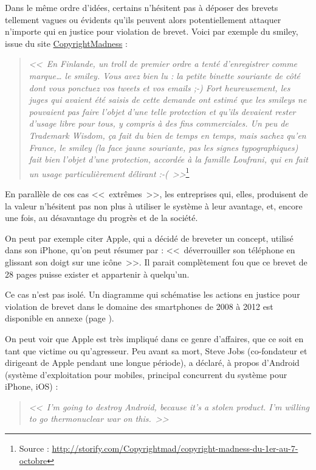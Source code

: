 Dans le même ordre d'idées, certains n'hésitent pas à déposer des brevets tellement vagues ou évidents qu'ils peuvent alors potentiellement attaquer n'importe qui en justice pour violation de brevet.
Voici par exemple du smiley, issue du site \href{http://copyrightmadness.tumblr.com/}{CopyrightMadness} :

\begin{quotation}
\textit{<<~En Finlande, un troll de premier ordre a tenté d'enregistrer comme marque\dots{} le smiley.
Vous avez bien lu : la petite binette souriante de côté dont vous ponctuez vos tweets et vos emails ;-)
Fort heureusement, les juges qui avaient été saisis de cette demande ont estimé que les smileys ne pouvaient pas faire l'objet d'une telle protection et qu'ils devaient rester d'usage libre pour tous, y compris à des fins commerciales.
Un peu de Trademark Wisdom, ça fait du bien de temps en temps, mais sachez qu'en France, le smiley (la face jaune souriante, pas les signes typographiques) fait bien l'objet d'une protection, accordée à la famille Loufrani, qui en fait un usage particulièrement délirant :-(~>>}\footnote{Source : \url{http://storify.com/Copyrightmad/copyright-madness-du-1er-au-7-octobre}}
\end{quotation}

En parallèle de ces cas <<~extrêmes~>>, les entreprises qui, elles, produisent de la valeur n'hésitent pas non plus à utiliser le système à leur avantage, et, encore une fois, au désavantage du progrès et de la société.

On peut par exemple citer Apple, qui a décidé de breveter un concept, utilisé dans son iPhone, qu'on peut résumer par : <<~déverrouiller son téléphone en glissant son doigt sur une icône~>>.
Il parait complètement fou que ce brevet de 28 pages puisse exister et appartenir à quelqu'un.

Ce cas n'est pas isolé.
Un diagramme qui schématise les actions en justice pour violation de brevet dans le domaine des smartphones de 2008 à 2012 est disponible en annexe (page \pageref{annexe-smartphones}).

On peut voir que Apple est très impliqué dans ce genre d'affaires, que ce soit en tant que victime ou qu'agresseur.
Peu avant sa mort, Steve Jobs (co-fondateur et dirigeant de Apple pendant une longue période), a déclaré, à propos d'Android (système d'exploitation pour mobiles, principal concurrent du système pour iPhone, iOS) :

\begin{quote}
\textit{{\Large <<~I'm going to destroy Android, because it's a stolen product.
I'm willing to go thermonuclear war on this.~>>}}
\end{quote}

